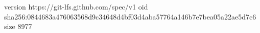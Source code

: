 version https://git-lfs.github.com/spec/v1
oid sha256:0844683a476063568d9c34648d4bf03d4aba57764a146b7e7bea05a22ae5d7c6
size 8977
